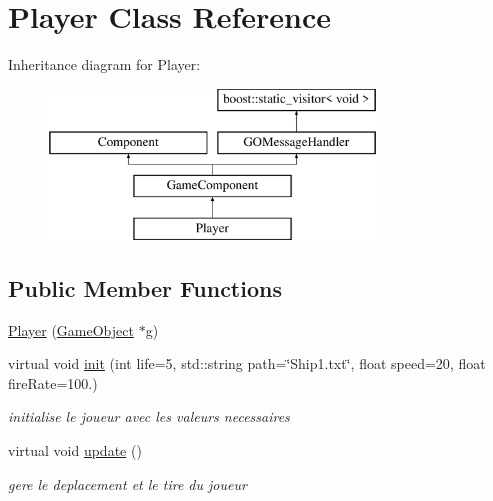 \hypertarget{class_player}{}\section{Player Class Reference}
\label{class_player}
Inheritance diagram for Player\+:\begin{figure}[H]
\begin{center}
\leavevmode
\includegraphics[height=4.000000cm]{class_player}
\end{center}
\end{figure}
\subsection*{Public Member Functions}
\begin{DoxyCompactItemize}
\item 
\hyperlink{class_player_ac9e2313c9f0599f111d51b1ededc7b59}{Player} (\hyperlink{class_game_object}{Game\+Object} $\ast$g)
\item 
virtual void \hyperlink{class_player_abde7e5d5c9b248e9d151b63342a1651f}{init} (int life=5, std\+::string path=\char`\"{}Ship1.\+txt\char`\"{}, float speed=20, float fire\+Rate=100.)
\begin{DoxyCompactList}\small\item\em initialise le joueur avec les valeurs necessaires \end{DoxyCompactList}\item 
\hypertarget{class_player_a82c3476f3e65a4e2ac6bcd040771bdd4}{}\label{class_player_a82c3476f3e65a4e2ac6bcd040771bdd4} 
virtual void \hyperlink{class_player_a82c3476f3e65a4e2ac6bcd040771bdd4}{update} ()
\begin{DoxyCompactList}\small\item\em gere le deplacement et le tire du joueur \end{DoxyCompactList}\end{DoxyCompactItemize}
